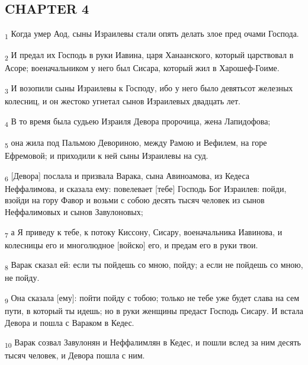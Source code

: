 \subsection{CHAPTER 4}
\begin{tcolorbox}
\textsubscript{1} Когда умер Аод, сыны Израилевы стали опять делать злое пред очами Господа.
\end{tcolorbox}
\begin{tcolorbox}
\textsubscript{2} И предал их Господь в руки Иавина, царя Ханаанского, который царствовал в Асоре; военачальником у него был Сисара, который жил в Харошеф-Гоиме.
\end{tcolorbox}
\begin{tcolorbox}
\textsubscript{3} И возопили сыны Израилевы к Господу, ибо у него было девятьсот железных колесниц, и он жестоко угнетал сынов Израилевых двадцать лет.
\end{tcolorbox}
\begin{tcolorbox}
\textsubscript{4} В то время была судьею Израиля Девора пророчица, жена Лапидофова;
\end{tcolorbox}
\begin{tcolorbox}
\textsubscript{5} она жила под Пальмою Девориною, между Рамою и Вефилем, на горе Ефремовой; и приходили к ней сыны Израилевы на суд.
\end{tcolorbox}
\begin{tcolorbox}
\textsubscript{6} [Девора] послала и призвала Варака, сына Авиноамова, из Кедеса Неффалимова, и сказала ему: повелевает [тебе] Господь Бог Израилев: пойди, взойди на гору Фавор и возьми с собою десять тысяч человек из сынов Неффалимовых и сынов Завулоновых;
\end{tcolorbox}
\begin{tcolorbox}
\textsubscript{7} а Я приведу к тебе, к потоку Киссону, Сисару, военачальника Иавинова, и колесницы его и многолюдное [войско] его, и предам его в руки твои.
\end{tcolorbox}
\begin{tcolorbox}
\textsubscript{8} Варак сказал ей: если ты пойдешь со мною, пойду; а если не пойдешь со мною, не пойду.
\end{tcolorbox}
\begin{tcolorbox}
\textsubscript{9} Она сказала [ему]: пойти пойду с тобою; только не тебе уже будет слава на сем пути, в который ты идешь; но в руки женщины предаст Господь Сисару. И встала Девора и пошла с Вараком в Кедес.
\end{tcolorbox}
\begin{tcolorbox}
\textsubscript{10} Варак созвал Завулонян и Неффалимлян в Кедес, и пошли вслед за ним десять тысяч человек, и Девора пошла с ним.
\end{tcolorbox}
